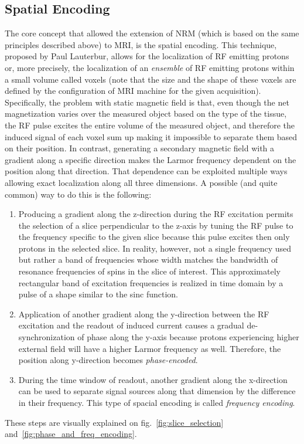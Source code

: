 \subsection{Spatial Encoding}
The core concept that allowed the extension of NRM (which is based on the same principles described above) to MRI, is the spatial encoding. This technique, proposed by Paul Lauterbur, allows for the localization of RF emitting protons or, more precisely, the localization of an \textit{ensemble} of RF emitting protons within a small volume called voxels (note that the size and the shape of these voxels are defined by the configuration of MRI machine for the given acquisition). Specifically, the problem with static magnetic field is that, even though the net magnetization varies over the measured object based on the type of the tissue, the RF pulse excites the entire volume of the measured object, and therefore the induced signal of each voxel sum up making it impossible to separate them based on their position. In contrast, generating a secondary magnetic field with a gradient along a specific direction makes the Larmor frequency dependent on the position along that direction. That dependence can be exploited multiple ways allowing exact localization along all three dimensions. A possible (and quite common) way to do this is the following:
\begin{enumerate}
    \item Producing a gradient along the z-direction during the RF excitation permits the selection of a slice perpendicular to the z-axis by tuning the RF pulse to the frequency specific to the given slice because this pulse excites then only protons in the selected slice. In reality, however, not a single frequency used but rather a band of frequencies whose width matches the bandwidth of resonance frequencies of spins in the slice of interest. This approximately rectangular band of excitation frequencies is realized in time domain by a pulse of a shape similar to the sinc function.
    \item Application of another gradient along the y-direction between the RF excitation and the readout of induced current causes a gradual de-synchronization of phase along the y-axis because protons experiencing higher external field will have a higher Larmor frequency as well. Therefore, the position along y-direction becomes \textit{phase-encoded}.
    \item During the time window of readout, another gradient along the x-direction can be used to separate signal sources along that dimension by the difference in their frequency. This type of spacial encoding is called \textit{frequency encoding}.
\end{enumerate}
These steps are visually explained on fig.~\ref{fig:slice_selection} and~\ref{fig:phase_and_freq_encoding}.

